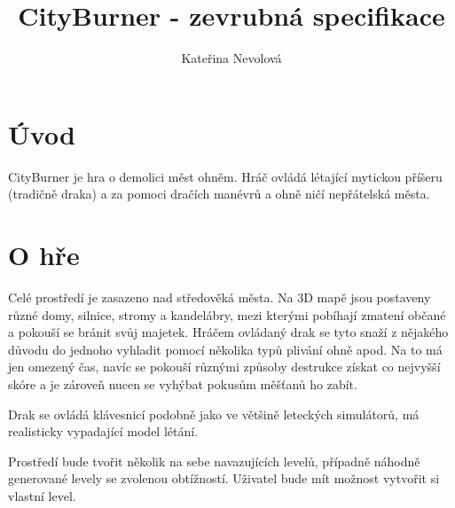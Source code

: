 \documentclass{article}
\title{CityBurner - zevrubná specifikace}
\author{Kateřina Nevolová}
\begin{document}
\maketitle

\section{Úvod}

CityBurner je hra o demolici měst ohněm. Hráč ovládá létající mytickou příšeru (tradičně draka) a za pomoci dračích manévrů a ohně ničí nepřátelská města.

\section{O hře}

Celé prostředí je zasazeno nad středověká města. Na 3D mapě jsou postaveny
různé domy, silnice, stromy a kandelábry, mezi kterými pobíhají zmatení občané a
pokouší se bránit svůj majetek. Hráčem ovládaný drak se tyto snaží z nějakého
důvodu do jednoho vyhladit pomocí několika typů plivání ohně apod. Na to má jen
omezený čas, navíc se pokouší různými způsoby destrukce získat co nejvyšší
skóre a je zároveň nucen se vyhýbat pokusům měšťanů ho zabít.

Drak se ovládá klávesnicí podobně jako ve většině leteckých simulátorů, má
realisticky vypadající model létání.

Prostředí bude tvořit několik na sebe navazujících levelů, případně náhodně
generované levely se zvolenou obtížností. Uživatel bude mít možnost vytvořit si
vlastní level.
\end{document}
